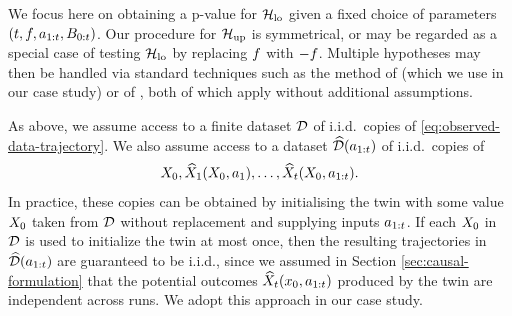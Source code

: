 



We focus here on obtaining a p-value for $\mathcal{H}_{\mathrm{lo}}$ given a fixed choice of parameters $(t, f, a_{1:t}, B_{0:t})$.
Our procedure for $\mathcal{H}_{\mathrm{up}}$ is symmetrical, or may be regarded as a special case of testing $\mathcal{H}_{\mathrm{lo}}$ by replacing $f$ with $-f$.
Multiple hypotheses may then be handled via standard techniques such as the method of \cite{holm1979simple} (which we use in our case study) or of \cite{benjamini2001control}, both of which apply without additional assumptions.

As above, we assume access to a finite dataset $\mathcal{D}$ of i.i.d.\ copies of \eqref{eq:observed-data-trajectory}.
We also assume access to a dataset $\widehat{\mathcal{D}}(a_{1:t})$ of i.i.d.\ copies of
\begin{equation} \label{eq:twin-trajecs}
    X_0, \widehat{X}_1(X_0, a_1), \ldots, \widehat{X}_t(X_0, a_{1:t}).
\end{equation}
In practice, these copies can be obtained by initialising the twin with some value $X_0$ taken from $\mathcal{D}$ without replacement and supplying inputs $a_{1:t}$.
If each $X_0$ in $\mathcal{D}$ is used to initialize the twin at most once, then the resulting trajectories in $\widehat{\mathcal{D}}(a_{1:t})$ are guaranteed to be i.i.d., since we assumed in Section \ref{sec:causal-formulation} that the potential outcomes $\widehat{X}_t(x_0, a_{1:t})$ produced by the twin are independent across runs.
We adopt this approach in our case study.

